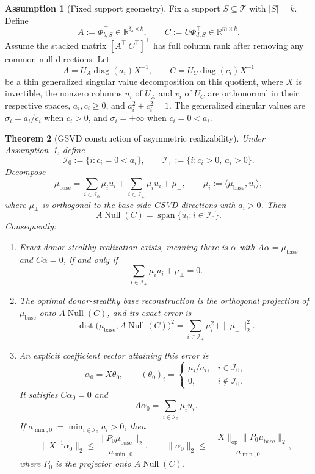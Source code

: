 \documentclass{article}
\theoremstyle{plain}
\newtheorem{theorem}{Theorem}[section]
\theoremstyle{definition}
\newtheorem{assumption}[theorem]{Assumption}
\theoremstyle{remark}
\begin{document}
\begin{assumption}[Fixed support geometry]
\label{ass:fixed-support-geometry}
Fix a support $S\subseteq\mathcal{T}$ with $|S|=k$. Define
\[
A:=\Phi_{b,S}^\top\in\mathbb{R}^{\delta_b\times k},
\qquad
C:=U\Phi_{d,S}^\top\in\mathbb{R}^{m\times k}.
\]
Assume the stacked matrix $[A^\top\ C^\top]^\top$ has full column rank after removing any common null directions. Let
\[
A=U_A\operatorname{diag}(a_i)X^{-1},
\qquad
C=U_C\operatorname{diag}(c_i)X^{-1}
\]
be a thin generalized singular value decomposition on this quotient, where $X$ is invertible, the nonzero columns $u_i$ of $U_A$ and $v_i$ of $U_C$ are orthonormal in their respective spaces, $a_i,c_i\ge 0$, and $a_i^2+c_i^2=1$. The generalized singular values are $\sigma_i=a_i/c_i$ when $c_i>0$, and $\sigma_i=+\infty$ when $c_i=0<a_i$.
\end{assumption}

\begin{theorem}[GSVD construction of asymmetric realizability]
\label{thm:exact-asymmetric-realizability}
Under Assumption~\ref{ass:fixed-support-geometry}, define
\[
\mathcal{I}_0:=\{i:c_i=0<a_i\},
\qquad
\mathcal{I}_+:=\{i:c_i>0,\ a_i>0\}.
\]
Decompose
\[
\mu_{\text{base}}
=
\sum_{i\in\mathcal{I}_0}\mu_i u_i
+
\sum_{i\in\mathcal{I}_+}\mu_i u_i
+
\mu_\perp,
\qquad
\mu_i:=\langle \mu_{\text{base}},u_i\rangle,
\]
where $\mu_\perp$ is orthogonal to the base-side GSVD directions with $a_i>0$. Then
\[
A\operatorname{Null}(C)=\operatorname{span}\{u_i:i\in\mathcal{I}_0\}.
\]
Consequently:
\begin{enumerate}[leftmargin=*]
\item Exact donor-stealthy realization exists, meaning there is $\alpha$ with $A\alpha=\mu_{\text{base}}$ and $C\alpha=0$, if and only if
\[
\sum_{i\in\mathcal{I}_+}\mu_i u_i+\mu_\perp=0.
\]
\item The optimal donor-stealthy base reconstruction is the orthogonal projection of $\mu_{\text{base}}$ onto $A\operatorname{Null}(C)$, and its exact error is
\[
\operatorname{dist}\bigl(\mu_{\text{base}},A\operatorname{Null}(C)\bigr)^2
=
\sum_{i\in\mathcal{I}_+}\mu_i^2+\|\mu_\perp\|_2^2.
\]
\item An explicit coefficient vector attaining this error is
\[
\alpha_0=X\theta_0,
\qquad
(\theta_0)_i=
\begin{cases}
\mu_i/a_i, & i\in\mathcal{I}_0,\\
0, & i\notin\mathcal{I}_0.
\end{cases}
\]
It satisfies $C\alpha_0=0$ and
\[
A\alpha_0=\sum_{i\in\mathcal{I}_0}\mu_i u_i.
\]
If $a_{\min,0}:=\min_{i\in\mathcal{I}_0}a_i>0$, then
\[
\|X^{-1}\alpha_0\|_2
\le
\frac{\|P_0\mu_{\text{base}}\|_2}{a_{\min,0}},
\qquad
\|\alpha_0\|_2
\le
\frac{\|X\|_{\mathrm{op}}\|P_0\mu_{\text{base}}\|_2}{a_{\min,0}},
\]
where $P_0$ is the projector onto $A\operatorname{Null}(C)$.
\end{enumerate}
\end{theorem}
\end{document}

